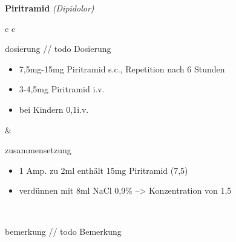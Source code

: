 \begin{frame}{
    \textbf{Piritramid}
    \textit{(Dipidolor)}
}
    \begin{tabular}{c c}
        \begin{beamercolorbox}[wd=\boxwidth\textwidth,ht=\boxheight\textheight,sep=1em]{dosierung}
        // todo Dosierung
            \begin{itemize}
                \item 7,5mg-15mg Piritramid s.c., Repetition nach 6 Stunden
                \item 3-4,5mg Piritramid i.v.
                \item bei Kindern 0,1\mgkgkg i.v.
            \end{itemize}
        \end{beamercolorbox} & 
        \begin{beamercolorbox}[wd=\boxwidth\textwidth,ht=\boxheight\textheight,sep=1em]{zusammensetzung}
            \begin{itemize}
                \item 1 Amp. zu 2ml enthält 15mg Piritramid (7,5\mgml)
                \item verdünnen mit 8ml NaCl 0,9\% --> Konzentration von 1,5\mgml
            \end{itemize}
        \end{beamercolorbox} \\
        \begin{beamercolorbox}[wd=\textwidth,ht=\boxheight\textheight,sep=1em]{bemerkung}
        // todo Bemerkung
        \end{beamercolorbox} \\
    \end{tabular}
\end{frame}

